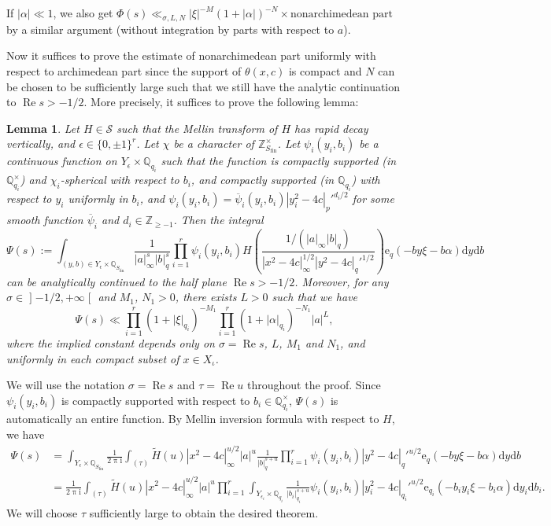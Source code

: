 \documentclass[10pt,oneside,reqno]{amsart}
\makeatletter
\newcommand\lopen{\mathopen{]}}
\newcommand\ropen{\mathclose{[}}
\newcommand\rmd{\mathrm{d}}
\newcommand\rme{\mathrm{e}}
\newcommand\rmi{\mathrm{i}}
\newcommand\cS{\mathcal{S}}
\newcommand\QQ{\mathbb{Q}}
\newcommand\ZZ{\mathbb{Z}}
\newcommand\dpii{2\uppi\rmi}
\renewcommand\Re{\mathop{\mathrm{Re}}}
\newcommand\fin{\mathrm{fin}}
\renewcommand\geq{\geqslant}
\newcommand\legendresymbol[2]{\genfrac{(}{)}{}{}{#1}{#2}}
\theoremstyle{THEOREM}
\newtheorem{lemma}[theorem]{Lemma}
\theoremstyle{DEFINITION}
\theoremstyle{EXERCISE}
\numberwithin{equation}{section}
\renewenvironment{proof}[1][\proofname]{\par
  \vspace{-6pt}
  \pushQED{\qed}
  \normalfont \topsep6\p@\@plus6\p@\relax
  \trivlist
  \item[\hskip\labelsep\rmfamily\bfseries
    #1\@addpunct{:}]\ignorespaces
}{
  \popQED\endtrivlist\@endpefalse
  \vspace{-6pt}
}
\newenvironment{insertproof}[1][\proofname]{\renewcommand\qedsymbol{$\blacksquare$}
  \par
  \vspace{-6pt}
  \pushQED{\qed}
  \normalfont \topsep6\p@\@plus6\p@\relax
  \trivlist
  \item[\hskip\labelsep\rmfamily\bfseries
    #1\@addpunct{:}]\ignorespaces
}{
  \popQED\endtrivlist\@endpefalse
  \vspace{-6pt}
}
\makeatother
\begin{document}
\begin{proof}
If $|\alpha|\ll 1$, we also get $\Phi(s)\ll_{\sigma,L,N}|\xi|^{-M}(1+|\alpha|)^{-N}\times\text{nonarchimedean part}$ by a similar argument (without integration by parts with respect to $a$).

Now it suffices to prove the estimate of nonarchimedean part uniformly with respect to archimedean part since the support of $\theta(x,c)$ is compact and $N$ can be chosen to be sufficiently large such that we still have the analytic continuation to $\Re s>-1/2$. More precisely, it suffices to prove the following lemma:
\begin{lemma}
Let $H\in \cS$ such that the Mellin transform of $H$ has rapid decay vertically, and $\epsilon\in \{0,\pm 1\}^r$. Let $\chi$ be a character of $\ZZ_{S_\fin}^\times$. Let $\psi_i(y_i,b_i)$ be a continuous function on $Y_\epsilon\times \QQ_{q_i}$ such that the function is compactly supported (in $\QQ_{q_i}^\times$) and $\chi_i$-spherical with respect to $b_i$, and compactly supported (in $\QQ_{q_i}$) with respect to $y_i$ uniformly in $b_i$, and $\psi_i(y_i,b_i) =\overline{\psi}_i(y_i,b_i)|y_i^2-4c|_p'^{d_i/2}$ for some smooth function $\overline{\psi}_i$ and $d_i\in \ZZ_{\geq -1}$.
Then the integral
\[
\Psi(s):=\int_{(y,b)\in Y_\epsilon\times\QQ_{S_\fin}} \frac{1}{|a|_\infty^{s}|b|_q^{s}} \prod_{i=1}^{r}\psi_{i}(y_i,b_i) H\legendresymbol{1/(|a|_\infty|b|_q)}{|x^2-4c|_\infty^{1/2}|y^2- 4c|_q'^{1/2}}\rme_{q}(-by\xi-b\alpha)\rmd y\rmd b
\]
can be analytically continued to the half plane $\Re s>-1/2$. Moreover, for any $\sigma\in\lopen -1/2,+\infty\ropen$ and $M_1$, $N_1>0$, there exists $L>0$ such that we have
\[
\Psi(s)\ll \prod_{i=1}^{r}(1+|\xi|_{q_i})^{-M_1}\prod_{i=1}^{r}(1+|\alpha|_{q_i})^{-N_1}|a|^L,
\]
where the implied constant depends only on $\sigma=\Re s$, $L$, $M_1$ and $N_1$, and uniformly in each compact subset of $x\in X_\iota$.
\end{lemma}
\begin{insertproof}
We will use the notation $\sigma=\Re s$ and $\tau=\Re u$ throughout the proof.
Since $\psi_i(y_i,b_i)$ is compactly supported with respect to $b_i\in \QQ_{q_i}^\times$, $\Psi(s)$ is automatically an entire function. By Mellin inversion formula with respect to $H$, we have
\begin{align*}
\Psi(s)&=\int_{Y_\epsilon\times\QQ_{S_\fin}} \frac{1}{\dpii}\int_{(\tau)}\widetilde{H}(u)|x^2-4c|_\infty^{u/2}|a|^u\frac{1}{|b|_q^{s+u}} \prod_{i=1}^{r}\psi_{i}(y_i,b_i)|y^2-4c|_q'^{u/2}\rme_{q}(-by\xi-b\alpha)\rmd y\rmd b\\
&=\frac{1}{\dpii}\int_{(\tau)}\widetilde{H}(u)|x^2-4c|_\infty^{u/2}|a|^u\prod_{i=1}^{r} \int_{Y_{\epsilon_i}\times \QQ_{q_i}}\frac{1}{|b_i|_{q_i}^{s+u}} \psi_{i}(y_i,b_i)|y_i^2-4c|_{q_i}'^{u/2}\rme_{q_i}(-b_iy_i\xi-b_i\alpha)\rmd y_i\rmd b_i.
\end{align*}
We will choose $\tau$ sufficiently large to obtain the desired theorem.


\end{insertproof}
\end{proof}
\end{document}
